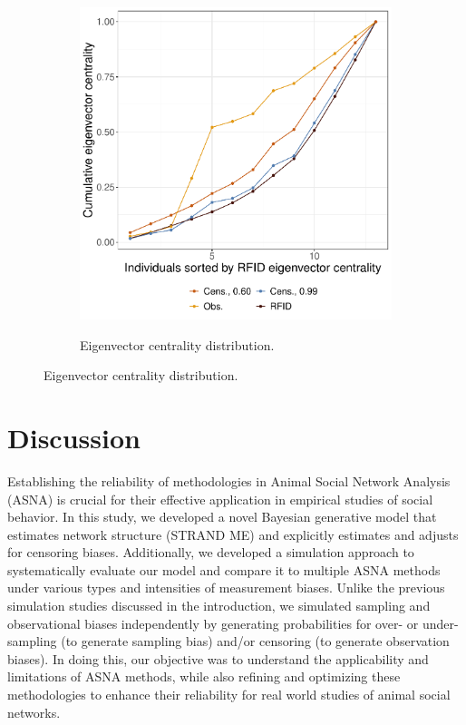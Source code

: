 \documentclass[Afour,sageh,times]{sagej}
\begin{document}
\begin{figure}[t]
\begin{minipage}[t]{0.31\textwidth}
\begin{subfigure}[t]{0.99\textwidth}
        \label{MonkeyBusiness5}
  \end{subfigure}
  \begin{subfigure}[t]{0.99\textwidth}
    \centering
        \caption{Eigenvector centrality distribution.}
        \includegraphics[width=\textwidth]{Figures/Baboons_Centrality.pdf}
        \label{MonkeyBusiness6}
  \end{subfigure}
\end{minipage}
\end{figure}

\section{Discussion}
Establishing the reliability of methodologies in Animal Social Network Analysis (ASNA) is crucial for their effective application in empirical studies of social behavior. In this study, we developed a novel Bayesian generative model that estimates network structure (STRAND ME) and explicitly estimates and adjusts for censoring biases. Additionally, we developed a simulation approach to systematically evaluate our model and compare it to multiple ASNA methods under various types and intensities of measurement biases. Unlike the previous simulation studies discussed in the introduction, we simulated sampling and observational biases independently by generating probabilities for over- or under-sampling (to generate sampling bias) and/or censoring (to generate observation biases). 
In doing this, our objective was to understand the applicability and limitations of ASNA methods, while also refining and optimizing these methodologies to enhance their reliability for real world studies of animal social networks. 
\end{document}
